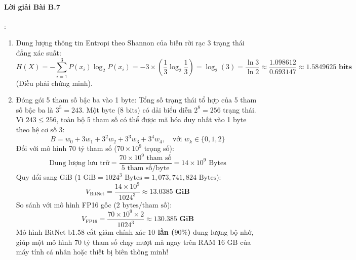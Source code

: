 \paragraph{Lời giải Bài B.7}:
\begin{enumerate}
  \item Dung lượng thông tin Entropi theo Shannon của biến rời rạc 3 trạng thái đẳng xác suất:
  \begin{equation*}
  H(X) = -\sum_{i=1}^3 P(x_i) \log_2 P(x_i) = -3 \times \left(\frac{1}{3} \log_2 \frac{1}{3}\right) = \log_2(3) = \frac{\ln 3}{\ln 2} \approx \frac{1.098612}{0.693147} \approx \mathbf{1.5849625\text{ bits}}
  \end{equation*}
  (Điều phải chứng minh).

  \item Đóng gói 5 tham số bậc ba vào 1 byte:
  Tổng số trạng thái tổ hợp của 5 tham số bậc ba là $3^5 = 243$.
  Một byte ($8\text{ bits}$) có dải biểu diễn $2^8 = 256$ trạng thái. Vì $243 \le 256$, toàn bộ 5 tham số có thể được mã hóa duy nhất vào 1 byte theo hệ cơ số 3:
  \begin{equation*}
  B = w_0 + 3 w_1 + 3^2 w_2 + 3^3 w_3 + 3^4 w_4, \quad \text{với } w_k \in \{0, 1, 2\}
  \end{equation*}
  Đối với mô hình 70 tỷ tham số ($70 \times 10^9$ trọng số):
  \begin{equation*}
  \text{Dung lượng lưu trữ} = \frac{70 \times 10^9 \text{ tham số}}{5 \text{ tham số/byte}} = 14 \times 10^9\text{ Bytes}
  \end{equation*}
  Quy đổi sang GiB ($1\text{ GiB} = 1024^3\text{ Bytes} = 1{,}073{,}741{,}824\text{ Bytes}$):
  \begin{equation*}
  V_{\text{BitNet}} = \frac{14 \times 10^9}{1024^3} \approx \mathbf{13.0385\text{ GiB}}
  \end{equation*}
  So sánh với mô hình FP16 gốc ($2\text{ bytes/tham số}$):
  \begin{equation*}
  V_{\text{FP16}} = \frac{70 \times 10^9 \times 2}{1024^3} \approx \mathbf{130.385\text{ GiB}}
  \end{equation*}
  Mô hình BitNet b1.58 cắt giảm chính xác \textbf{$10$ lần ($90\%$)} dung lượng bộ nhớ, giúp một mô hình 70 tỷ tham số chạy mượt mà ngay trên RAM $16\text{ GB}$ của máy tính cá nhân hoặc thiết bị biên thông minh!
\end{enumerate}

